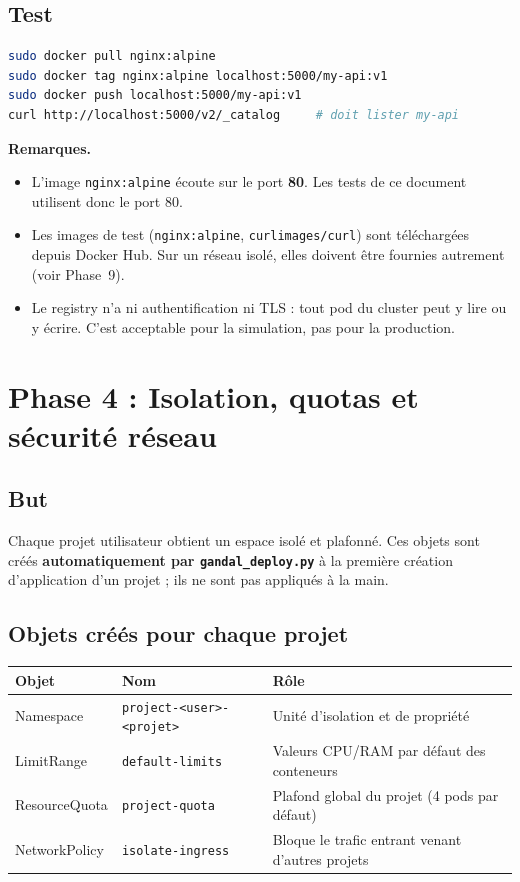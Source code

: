 \documentclass[12pt,a4paper]{article}
\begin{document}
\subsection{Test}
\begin{lstlisting}[language=bash]
sudo docker pull nginx:alpine
sudo docker tag nginx:alpine localhost:5000/my-api:v1
sudo docker push localhost:5000/my-api:v1
curl http://localhost:5000/v2/_catalog     # doit lister my-api
\end{lstlisting}

\textbf{Remarques.}
\begin{itemize}
    \item L'image \texttt{nginx:alpine} écoute sur le port \textbf{80}. Les tests de ce document utilisent donc le port 80.
    \item Les images de test (\texttt{nginx:alpine}, \texttt{curlimages/curl}) sont téléchargées depuis Docker Hub. Sur un réseau isolé, elles doivent être fournies autrement (voir Phase~9).
    \item Le registry n'a ni authentification ni TLS : tout pod du cluster peut y lire ou y écrire. C'est acceptable pour la simulation, pas pour la production.
\end{itemize}

\section{Phase 4 : Isolation, quotas et sécurité réseau}

\subsection{But}
Chaque projet utilisateur obtient un espace isolé et plafonné. Ces objets sont créés \textbf{automatiquement par \texttt{gandal\_deploy.py}} à la première création d'application d'un projet ; ils ne sont pas appliqués à la main.

\subsection{Objets créés pour chaque projet}
\begin{center}
\begin{tabular}{lll}
\toprule
\textbf{Objet} & \textbf{Nom} & \textbf{Rôle} \\
\midrule
Namespace & \nolinkurl{project-<user>-<projet>} & Unité d'isolation et de propriété \\
LimitRange & \texttt{default-limits} & Valeurs CPU/RAM par défaut des conteneurs \\
ResourceQuota & \texttt{project-quota} & Plafond global du projet (4 pods par défaut) \\
NetworkPolicy & \texttt{isolate-ingress} & Bloque le trafic entrant venant d'autres projets \\
\bottomrule
\end{tabular}
\end{center}
\end{document}
